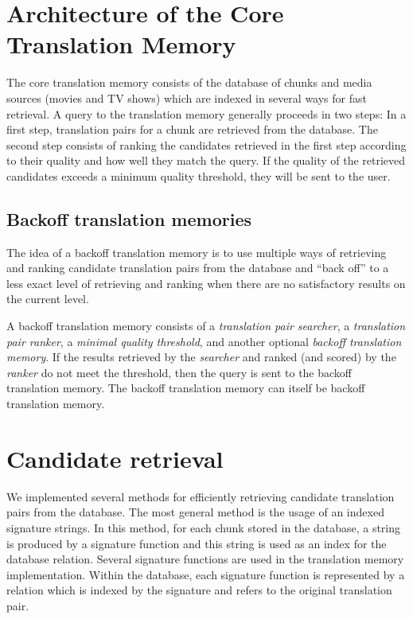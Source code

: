 \section{Architecture of the Core Translation Memory}

The core translation memory consists of the database of chunks and media
sources (movies and TV shows) which are indexed in several ways for fast
retrieval. A query to the translation memory generally proceeds in two
steps: In a first step, translation pairs for a chunk are retrieved from
the database. The second step consists of ranking the candidates
retrieved in the first step according to their quality and how well they
match the query. If the quality of the retrieved candidates exceeds a
minimum quality threshold, they will be sent to the user.

\subsection{Backoff translation memories}

The idea of a backoff translation memory is to use multiple ways of
retrieving and ranking candidate translation pairs from the database and
``back off'' to a less exact level of retrieving and ranking when there
are no satisfactory results on the current level.

A backoff translation memory consists of a \emph{translation pair
searcher}, a \emph{translation pair ranker}, a \emph{minimal quality
threshold}, and another optional \emph{backoff translation memory}. If
the results retrieved by the \emph{searcher} and ranked (and scored) by
the \emph{ranker} do not meet the threshold, then the query is sent to
the backoff translation memory. The backoff translation memory can
itself be backoff translation memory.


\section{Candidate retrieval}

We implemented several methods for efficiently retrieving candidate
translation pairs from the database. The most general method
is the usage of an indexed signature strings. In this method, for each
chunk stored in the database, a string is produced by a signature
function and this string is used as an index for the database relation.
Several signature functions are used in the translation memory
implementation. Within the database, each signature function is represented by 
a relation which is indexed by the signature and refers to the original
translation pair.


